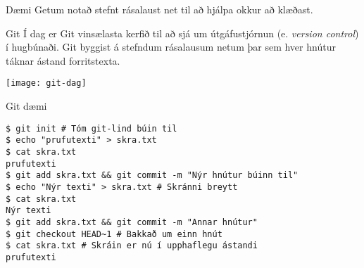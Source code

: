 \documentclass[handout]{beamer}
\begin{document}
\begin{frame}{Dæmi}
    \vspace{\baselineskip}
    Getum notað stefnt rásalaust net til að hjálpa okkur að klæðast.
    
    \begin{center}
        \usetikzlibrary{arrows}
    \end{center}
\end{frame}

\begin{frame}{Git}
    Í dag er Git vinsælasta kerfið til að sjá um útgáfustjórnun (e. \emph{version control}) í hugbúnaði. 
    Git byggist á stefndum rásalausum netum þar sem hver hnútur táknar ástand forritstexta.

    \begin{center}
        \texttt{[image: git-dag]}
    \end{center}
\end{frame}

\begin{frame}[fragile]{Git dæmi}
\begin{verbatim}
$ git init # Tóm git-lind búin til
$ echo "prufutexti" > skra.txt
$ cat skra.txt 
prufutexti
$ git add skra.txt && git commit -m "Nýr hnútur búinn til"
$ echo "Nýr texti" > skra.txt # Skránni breytt
$ cat skra.txt
Nýr texti
$ git add skra.txt && git commit -m "Annar hnútur"
$ git checkout HEAD~1 # Bakkað um einn hnút
$ cat skra.txt # Skráin er nú í upphaflegu ástandi
prufutexti
\end{verbatim}
\end{frame}
\end{document}
